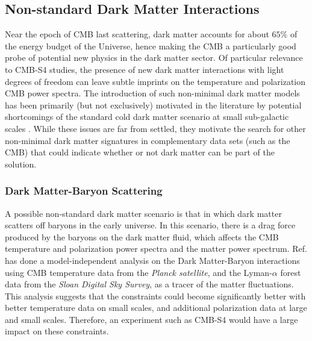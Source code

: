 \subsection{Non-standard Dark Matter Interactions}
%
Near the epoch of CMB last scattering, dark matter accounts for about $65\%$ of the energy budget of the Universe, hence making the CMB a particularly good probe of potential new physics in the dark matter sector. Of particular relevance to CMB-S4 studies, the presence of new dark matter interactions with light degrees of freedom \cite{Goldberg:1986nk,Carlson:1992fn,Gradwohl:1992ue,Machacek:1994vg,deLaix:1995vi,AtrioBarandela:1996ur,Boehm:2001hm,Foot:2004pa,Green:2005fa,Profumo:2006bv,Mangano:2006mp,Ackerman:2008gi,ArkaniHamed:2008qn,Feng:2009mn,Serra:2009uu,Bringmann:2009vf,Kaplan:2009de,McDermott:2010pa,Kaplan:2011yj,Aarssen:2012fx,Diamanti:2012tg,Baldi:2012ua,Cline:2012is,CyrRacine:2012fz,Fan:2013yva,Fan:2013tia,Cyr-Racine:2013fsa,Bringmann:2013vra,Wilkinson:2013kia,Dvorkin:2013cea,Boehm:2014vja,Wilkinson:2014ksa,Escudero:2015yka,Chu:2014lja,Archidiacono:2014nda,Buen-Abad:2015ova,Lesgourgues:2015wza} can leave subtle imprints on the temperature and polarization CMB power spectra. The introduction of such non-minimal dark matter models has been primarily (but not exclusively) motivated in the literature by potential shortcomings of the standard cold dark matter scenario at small sub-galactic scales \cite{deBlok:1997zlw,Klypin:1999uc,Moore:1999nt,Zavala:2009ms,Oh:2010ea,BoylanKolchin:2011de,Papastergis:2011xe,Walker:2011zu,Pawlowski:2013kpa,Klypin:2014ira,Oman:2015xda,Papastergis:2014aba}. While these issues are far from settled, they motivate the search for other non-minimal dark matter signatures in complementary data sets (such as the CMB) that could indicate whether or not dark matter can be part of the solution. 

\subsubsection{Dark Matter-Baryon Scattering}

A possible non-standard dark matter scenario is that in which dark matter scatters off baryons in the early universe. 
In this scenario, there is a drag force produced by the baryons on the dark matter fluid, which affects the CMB temperature and polarization power spectra and the matter power spectrum.
Ref. \cite{Dvorkin:2013cea} has done a model-independent analysis on the Dark Matter-Baryon interactions using CMB temperature data from the {\it Planck satellite}, and the Lyman-$\alpha$ forest data from the {\it Sloan Digital Sky Survey}, as a tracer of the matter fluctuations. This analysis suggests that the constraints could become significantly better with better temperature data on small scales, and additional polarization data at large and small scales. Therefore, an experiment such as CMB-S4 would have a large impact on these constraints.

